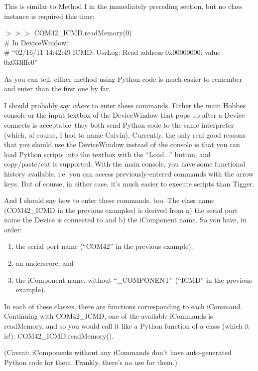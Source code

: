 This is similar to Method I in the immediately preceding section, but no class instance is required this time:

\noindent $>>>$ COM42\_ICMD.readMemory(0) \\ \# In DeviceWindow: \\ \# ``02/16/11 14:42:49 ICMD: UsrLog: Read address 0x00000000: value 0x033fffc0''
\vspace{12pt}

As you can tell, either method using Python code is much easier to remember and enter than the first one by far.

I should probably say \emph{where} to enter these commands. Either the main Hobbes console or the input textbox of the DeviceWindow that pops up after a Device connects is acceptable--they both send Python code to the same interpreter (which, of course, I had to name Calvin). Currently, the only real good reasons that you should use the DeviceWindow instead of the console is that you can load Python scripts into the textbox with the ``Load...'' button, and copy/paste/cut is supported. With the main console, you have some functional history available, i.e. you can access previously-entered commands with the arrow keys. But of course, in either case, it's much easier to execute scripts than Tigger.

And I should say how to enter these commands, too. The class name (COM42\_ICMD in the previous examples) is derived from a) the serial port name the Device is connected to and b) the iComponent name. So you have, in order:

\begin{enumerate}
\item the serial port name (``COM42'' in the previous example);
\item an underscore; and
\item the iComponent name, without ``\_COMPONENT'' (``ICMD'' in the previous example).
\end{enumerate}

In each of these classes, there are functions corresponding to each iCommand. Continuing with COM42\_ICMD, one of the available iCommands is readMemory, and so you would call it like a Python function of a class (which it is!): COM42\_ICMD.readMemory().

(Caveat: iComponents without any iCommands don't have auto-generated Python code for them. Frankly, there's no use for them.)

